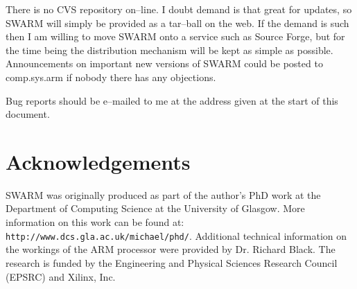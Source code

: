 \documentclass[10pt,a4paper]{article}
\begin{document}
There is no CVS repository on--line. I doubt demand is that great for
updates, so SWARM will simply be provided as a tar--ball on the
web. If the demand is such then I am willing to move SWARM onto a
service such as Source Forge, but for the time being the distribution
mechanism will be kept as simple as possible. Announcements on
important new versions of SWARM could be posted to comp.sys.arm if
nobody there has any objections.

Bug reports should be e--mailed to me at the address given at the
start of this document.


\section{Acknowledgements} %
\label{sec:acks}           %

SWARM was originally produced as part of the author's PhD work at the
Department of Computing Science at the University of Glasgow. More
information on this work can be found at:
\newline
\newline
\texttt{http://www.dcs.gla.ac.uk/michael/phd/}. 
\newline
\newline
Additional technical information on the workings of the ARM processor
were provided by Dr. Richard Black. The research is funded by the
Engineering and Physical Sciences Research Council (EPSRC) and Xilinx, Inc.


\end{document}
